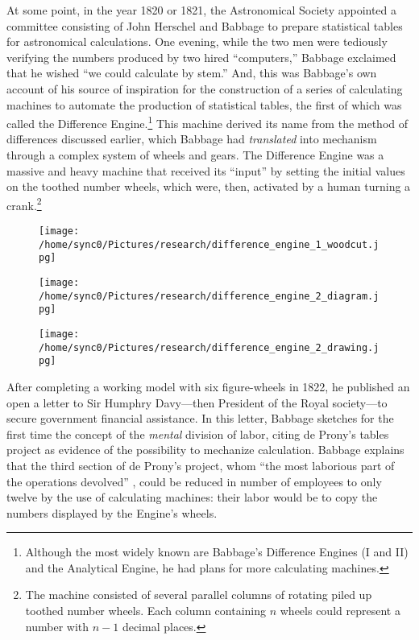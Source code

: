 \documentclass[version=last,draft=false,paper=A4,portrait,twoside=true,twocolumn=false,headinclude=false,footinclude=false,mpinclude=true,fontsize=12,BCOR=20mm,DIV=calc,pagesize=auto,open=right,chapterprefix=true,numbers=autoendperiod,headsepline=false,headings=twolinechapter,parskip=false]{scrbook}
\begin{document}
At some point, in the year 1820 or 1821, the Astronomical Society appointed
a committee consisting of John Herschel and Babbage to prepare statistical
tables for astronomical calculations. One evening, while the two men were
tediously verifying the numbers produced by two hired ``computers,''
Babbage exclaimed that he wished ``we could calculate by stem.'' And, this
was Babbage's own account of his source of inspiration for the construction
of a series of calculating machines to automate the production of
statistical tables, the first of which was called the Difference Engine.\footnote{Although the most widely known are Babbage's Difference Engines (I
and II) and the Analytical Engine, he had plans for more calculating
machines.}
This machine derived its name from the method of differences discussed
earlier, which Babbage had \emph{translated} into mechanism through a complex
system of wheels and gears. The Difference Engine was a massive and heavy
machine that received its ``input'' by setting the initial values on the
toothed number wheels, which were, then, activated by a human turning a
crank.\footnote{The machine consisted of several parallel columns of rotating piled
up toothed number wheels. Each column containing \(n\) wheels could represent
a number with  \(n - 1\) decimal places.} 

\begin{figure}[htbp]
\centering
\texttt{[image: /home/sync0/Pictures/research/difference\_engine\_1\_woodcut.jpg]}
\end{figure}

\begin{figure}[htbp]
\centering
\texttt{[image: /home/sync0/Pictures/research/difference\_engine\_2\_diagram.jpg]}
\end{figure}

\begin{figure}[htbp]
\centering
\texttt{[image: /home/sync0/Pictures/research/difference\_engine\_2\_drawing.jpg]}
\end{figure}


After completing a working model with six figure-wheels in 1822, he
published an open a letter to Sir Humphry Davy---then President of the
Royal society---to secure government financial assistance. In this letter,
Babbage sketches for the first time the concept of the \emph{mental} division of
labor, citing de Prony's tables project as evidence of the possibility to
mechanize calculation. Babbage explains that the third section of de
Prony's project, whom ``the most laborious part of the operations
devolved'' \autocite[p. 214]{babbage1822}, could be reduced in number of
employees to only twelve by the use of calculating machines: their labor
would be to copy the numbers displayed by the Engine's wheels.
\end{document}
